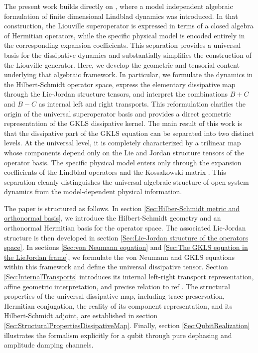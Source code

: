 \documentclass[notitlepage,aip,reprint,onecolumn]{revtex4-1}
\theoremstyle{definition}
\begin{document}
The present work builds directly on \cite{Bixano:2026qce}, where a model independent algebraic formulation of finite dimensional Lindblad  dynamics was introduced. In that construction, the Liouville superoperator is expressed in terms of a closed algebra of Hermitian operators, while the specific physical model is encoded entirely in the corresponding expansion coefficients. This separation provides a universal basis for the dissipative dynamics and substantially simplifies the construction of the Liouville
generator. Here, we develop the geometric and tensorial content underlying that algebraic framework. In particular, we formulate the dynamics in the Hilbert-Schmidt operator space, express the elementary dissipative map through the Lie-Jordan structure tensors, and interpret the combinations \(B+C\) and \(B-C\) as internal left and right transports. This reformulation clarifies the origin of the universal superoperator basis and provides a direct geometric representation of the GKLS dissipative kernel.
The main result of this work is that the dissipative part of the GKLS
equation can be separated into two distinct levels.
At the universal level, it is completely characterized by a trilinear
map whose components depend only on the Lie and Jordan structure tensors
of the operator basis.
The specific physical model enters only through the expansion coefficients
of the Lindblad operators and the Kossakowski matrix \cite{Kossakowski:1972sbn}.
This separation cleanly distinguishes the universal algebraic structure 
of open-system dynamics from the model-dependent physical information.

The paper is structured as follows. In section \ref{Sec:Hilber-Schmidt metric and orthonormal basis}, we introduce the Hilbert-Schmidt geometry and an orthonormal Hermitian basis for the operator space. The associated Lie-Jordan structure is then developed in section \ref{Sec:Lie-Jordan structure of the operators space}. In sections \ref{Sec:von Neumann equation} and \ref{Sec:The GKLS equation in the LieJordan frame}, we formulate the von Neumann and GKLS equations within this framework and define the universal dissipative tensor. Section \ref{Sec:InternalTransports} introduces its internal left-right transport representation, affine geometric interpretation, and precise relation to ref \cite{Bixano:2026qce}. The structural properties of the universal dissipative map, including trace preservation, Hermitian conjugation, the reality of its component representation, and its Hilbert-Schmidt adjoint, are established in section \ref{Sec:StructuralPropertiesDissipativeMap}. Finally, section \ref{Sec:QubitRealization} illustrates the formalism explicitly for a qubit through pure dephasing and amplitude damping channels.
\end{document}
